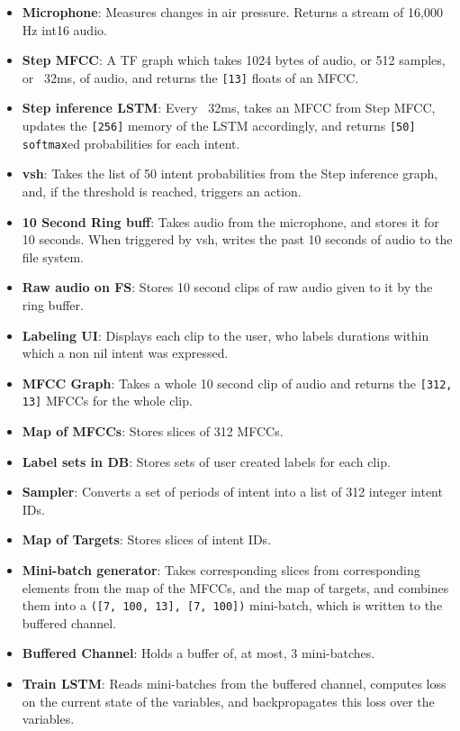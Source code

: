 \documentclass[conference]{IEEEtran}
\begin{document}
\begin{itemize}
\item \textbf{Microphone}: Measures changes in air pressure. Returns a stream of 16,000 Hz int16 audio.
\item \textbf{Step MFCC}: A TF graph which takes 1024 bytes of audio, or 512 samples, or ~32ms, of audio, and returns the \texttt{[13]} floats of an MFCC.
\item \textbf{Step inference LSTM}: Every ~32ms, takes an MFCC from Step MFCC, updates the \texttt{[256]} memory of the LSTM accordingly, and returns \texttt{[50]} \texttt{softmax}ed probabilities for each intent.
\item \textbf{vsh}: Takes the list of 50 intent probabilities from the Step inference graph, and, if the threshold is reached, triggers an action.
\item \textbf{10 Second Ring buff}: Takes audio from the microphone, and stores it for 10 seconds. When triggered by vsh, writes the past 10 seconds of audio to the file system.
\item \textbf{Raw audio on FS}: Stores 10 second clips of raw audio given to it by the ring buffer.
\item \textbf{Labeling UI}: Displays each clip to the user, who labels durations within which a non nil intent was expressed.
\item \textbf{MFCC Graph}: Takes a whole 10 second clip of audio and returns the \texttt{[312, 13]} MFCCs for the whole clip.
\item \textbf{Map of MFCCs}: Stores slices of 312 MFCCs.
\item \textbf{Label sets in DB}: Stores sets of user created labels for each clip.
\item \textbf{Sampler}: Converts a set of periods of intent into a list of 312 integer intent IDs.
\item \textbf{Map of Targets}: Stores slices of intent IDs.
\item \textbf{Mini-batch generator}: Takes corresponding slices from corresponding elements from the map of the MFCCs, and the map of targets, and combines them into a \texttt{([7, 100, 13], [7, 100])} mini-batch, which is written  to the buffered channel.
\item \textbf{Buffered Channel}: Holds a buffer of, at most, 3 mini-batches.
\item \textbf{Train LSTM}: Reads mini-batches from the buffered channel, computes loss on the current state of the variables, and backpropagates this loss over the variables.
\end{itemize}
\end{document}
